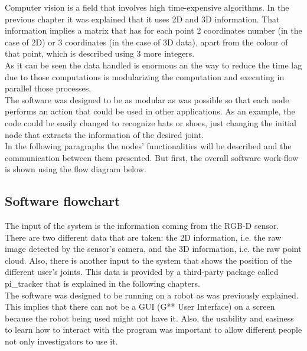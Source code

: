 Computer vision is a field that involves high time-expensive algorithms. In the previous chapter it was explained that it uses 2D and 3D information. That information implies a matrix that has for each point 2 coordinates number (in the case of 2D) or 3 coordinates (in the case of 3D data), apart from the colour of that point, which is described using 3 more integers. \\

As it can be seen the data handled is enormous an the way to reduce the time lag due to those computations is modularizing the computation and executing in parallel those processes. 
\\

The software was designed to be as modular as was possible so that each node performs an action that could be used in other applications. 
As an example, the code could be easily changed to recognize hats or shoes, just changing the initial node that extracts the information of the desired joint. 
\\

In the following paragraphs the nodes' functionalities will be described and the communication between them presented. But first, the overall software work-flow is shown using the flow diagram below. 

\newpage
\subsection*{Software flowchart}

The input of the system is the information coming from the RGB-D sensor. There are two different data that are taken: the 2D information, i.e. the raw image detected by the sensor's camera, and the 3D information, i.e. the raw point cloud. Also, there is another input to the system that shows the position of the different user's joints. This data is provided by a third-party package called pi\_tracker that is explained in the following chapters. 
\\

The software was designed to be running on a robot as was previously explained. This implies that there can not be a GUI (G** User Interface) on a screen because the robot being used might not have it. Also, the usability and easiness to learn how to interact with the program was important to allow different people not only investigators to use it. 
\\


